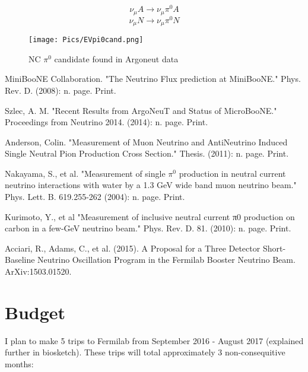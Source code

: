 \documentclass[12pt]{article}
\begin{document}
\begin{equation} \label{eq:coh}
\nu_\mu A \rightarrow \nu_\mu \pi^0 A 
\end{equation}
\begin{equation} \label{eq:incoh}
\nu_\mu N \rightarrow \nu_\mu \pi^0 N
\end{equation}


%
\begin{figure}[h!]
\centering
\texttt{[image: Pics/EVpi0cand.png]}
\caption{NC $\pi^0$ candidate found in Argoneut data}
\end{figure}

\begin{thebibliography}{20} %

MiniBooNE Collaboration. "The Neutrino Flux prediction at MiniBooNE." Phys. Rev. D. (2008): n. page. Print.

Szlec, A. M. "Recent Results from ArgoNeuT and Status of MicroBooNE." Proceedings from Neutrino 2014. (2014): n. page. Print.

Anderson, Colin. "Measurement of Muon Neutrino and AntiNeutrino Induced Single Neutral Pion Production Cross Section." Thesis. (2011): n. page. Print.

Nakayama, S., et al. "Measurement of single $\pi^0$ production in neutral current neutrino interactions with water by a 1.3 GeV wide band muon neutrino beam." Phys. Lett. B. 619.255-262 (2004): n. page. Print.

Kurimoto, Y., et al "Measurement of inclusive neutral current π0 production on carbon in a few-GeV neutrino beam." Phys. Rev. D. 81. (2010): n. page. Print.

Acciari, R., Adams, C., et al. (2015). A Proposal for a Three Detector Short-Baseline Neutrino Oscillation Program in the Fermilab Booster Neutrino Beam. ArXiv:1503.01520.

\end{thebibliography}

\newpage
\section{ Budget }
\noindent I plan to make 5 trips to Fermilab from September 2016 - August 2017 (explained further in biosketch).  These trips will total approximately 3 non-consequitive months:
\\
\end{document}

